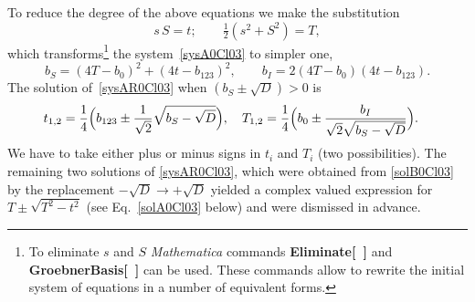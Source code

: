 \documentclass{birkjour}
\begin{document}
To reduce the degree of the above equations we make the
substitution
\begin{equation}\label{sysAS0Cl03}
  s\,S = t;\qquad  \tfrac{1}{2}(s^2 + S^2) = T,
\end{equation}
which transforms\footnote{To eliminate $s$ and $S$ {\it
Mathematica} commands \textbf{Eliminate[~]} and
  \textbf{GroebnerBasis[~]} can be used. These commands allow to rewrite the
initial system of equations in a number of equivalent forms.} the
  system~\eqref{sysA0Cl03} to simpler one,
\begin{equation}\label{sysAR0Cl03}
 b_{S}=(4 T-b_0)^2+(4 t-b_{123})^2,\qquad
  b_{I}=2 (4 T-b_0) (4 t-b_{123}).
\end{equation}
The solution of~\eqref{sysAR0Cl03} when $(b_{S}\pm\sqrt{D})
> 0$ is
\begin{equation}\label{solB0Cl03}
\begin{split}
  &t_{1,2}=\frac{1}{4} \Bigl(b_{123} \pm \frac{1}{\sqrt{2}}\sqrt{b_{S}-\sqrt{D}}\Bigr),\quad
  T_{1,2}=\frac{1}{4}\Bigl(b_{0}\pm\frac{ b_{I}}{\sqrt{2}\sqrt{b_{S}-\sqrt{D}}}\Bigr).
\end{split}
\end{equation}
We have to take either plus or minus signs in $t_i$ and
$T_i$ (two possibilities). The remaining two solutions of
\eqref{sysAR0Cl03}, which were obtained
from \eqref{solB0Cl03} by the replacement $-\sqrt{D}\to +\sqrt{D}$
yielded a complex valued expression for $T\pm\sqrt{T^2-
t^2}$ (see Eq.~\eqref{solA0Cl03} below) and were dismissed
in advance.
\end{document}
